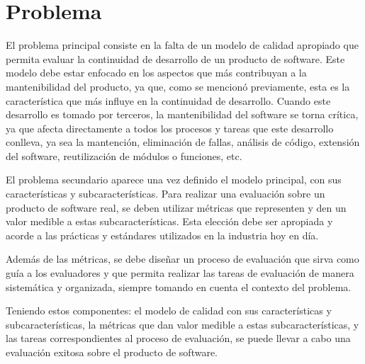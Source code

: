 \chapter{Problema}
\label{chap:problema}
El problema principal consiste en la falta de un modelo de calidad apropiado
que permita evaluar la continuidad de desarrollo de un producto de software.
Este modelo debe estar enfocado en los aspectos que más contribuyan a la mantenibilidad
del producto, ya que, como se mencionó previamente, esta es la característica que más
influye en la continuidad de desarrollo.
Cuando este desarrollo es tomado por terceros, la mantenibilidad
del software se torna crítica, ya que afecta directamente a todos los procesos y tareas
que este desarrollo conlleva, ya sea la mantención, eliminación de fallas, análisis de código,
extensión del software, reutilización de módulos o funciones, etc.

El problema secundario aparece una vez definido el modelo principal, con sus características
y subcaracterísticas. Para realizar una evaluación sobre un producto de software real, se deben
utilizar métricas que representen y den un valor medible a estas subcaracterísticas.
Esta elección debe ser apropiada y acorde a las prácticas y estándares utilizados en la industria
hoy en día.

Además de las métricas, se debe diseñar un proceso de evaluación que sirva como guía a los
evaluadores y que permita realizar las tareas de evaluación de manera sistemática y organizada,
siempre tomando en cuenta el contexto del problema.

Teniendo estos componentes: el modelo de calidad con sus características y subcaracterísticas,
la métricas que dan valor medible a estas subcaracterísticas, y las tareas correspondientes al proceso de evaluación, 
se puede llevar a cabo una evaluación exitosa sobre el producto de software.
